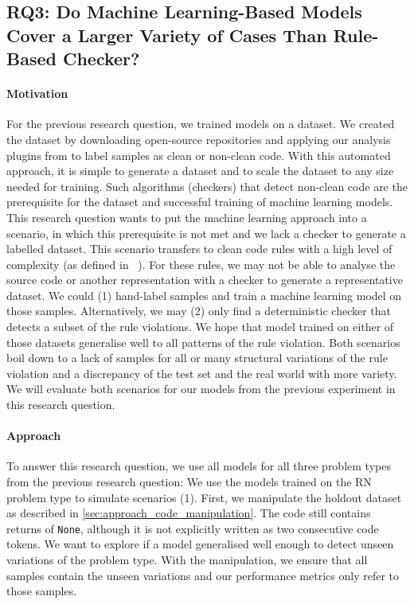 \subsection{RQ3: Do Machine Learning-Based Models Cover a Larger Variety of Cases Than Rule-Based Checker? }\label{rq:3}

\paragraph{Motivation}
For the previous research question, we trained models on a dataset. We created the dataset by downloading open-source repositories and applying our analysis plugins from  to label samples as clean or non-clean code. With this automated approach, it is simple to generate a dataset and to scale the dataset to any size needed for training. Such algorithms (checkers) that detect non-clean code are the prerequisite for the dataset and successful training of machine learning models. This research question wants to put the machine learning approach into a scenario, in which this prerequisite is not met and we lack a checker to generate a labelled dataset. 
This scenario transfers to clean code rules with a high level of complexity (as defined in ~). For these rules, we may not be able to analyse the source code or another representation with a checker to generate a representative dataset. We could (1) hand-label samples and train a machine learning model on those samples. Alternatively, we may (2) only find a deterministic checker that detects a subset of the rule violations. We hope that model trained on either of those datasets generalise well to all patterns of the rule violation. Both scenarios boil down to a lack of samples for all or many structural variations of the rule violation and a discrepancy of the test set and the real world with more variety. We will evaluate both scenarios for our models from the previous experiment in this research question.


\paragraph{Approach}
To answer this research question, we use all models for all three problem types from the previous research question: 
We use the models trained on the RN problem type to simulate scenarios (1). First, we manipulate the holdout dataset as described in \ref{sec:approach_code_manipulation}. The code still contains returns of \texttt{None}, although it is not explicitly written as two consecutive code tokens. We want to explore if a model generalised well enough to detect unseen variations of the problem type. With the manipulation, we ensure that all samples contain the unseen variations and our performance metrics only refer to those samples. 

